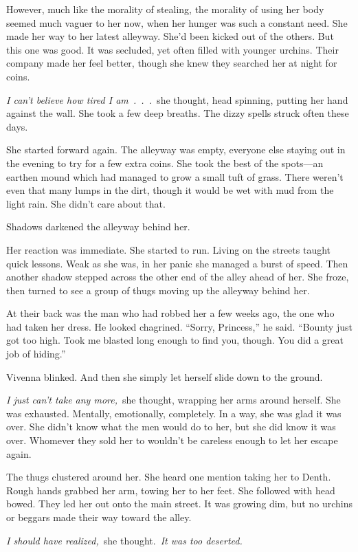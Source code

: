 However, much like the morality of stealing, the morality of using her body seemed much vaguer to her now, when her hunger was such a constant need. She made her way to her latest alleyway. She’d been kicked out of the others. But this one was good. It was secluded, yet often filled with younger urchins. Their company made her feel better, though she knew they searched her at night for coins.

\textit{I can’t believe how tired I am~.~.~.}~she thought, head spinning, putting her hand against the wall. She took a few deep breaths. The dizzy spells struck often these days.

She started forward again. The alleyway was empty, everyone else staying out in the evening to try for a few extra coins. She took the best of the spots—an earthen mound which had managed to grow a small tuft of grass. There weren’t even that many lumps in the dirt, though it would be wet with mud from the light rain. She didn’t care about that.

Shadows darkened the alleyway behind her.

Her reaction was immediate. She started to run. Living on the streets taught quick lessons. Weak as she was, in her panic she managed a burst of speed. Then another shadow stepped across the other end of the alley ahead of her. She froze, then turned to see a group of thugs moving up the alleyway behind her.

At their back was the man who had robbed her a few weeks ago, the one who had taken her dress. He looked chagrined. “Sorry, Princess,” he said. “Bounty just got too high. Took me blasted long enough to find you, though. You did a great job of hiding.”

Vivenna blinked. And then she simply let herself slide down to the ground.

\textit{I just can’t take any more,}~she thought, wrapping her arms around herself. She was exhausted. Mentally, emotionally, completely. In a way, she was glad it was over. She didn’t know what the men would do to her, but she did know it was over. Whomever they sold her to wouldn’t be careless enough to let her escape again.

The thugs clustered around her. She heard one mention taking her to Denth. Rough hands grabbed her arm, towing her to her feet. She followed with head bowed. They led her out onto the main street. It was growing dim, but no urchins or beggars made their way toward the alley.

\textit{I should have realized,}~she thought.~\textit{It was too deserted.}

